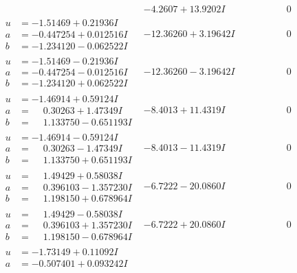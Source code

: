 \documentclass[1p]{elsarticle_modified}
\theoremstyle{definition}
\begin{document}
$$\begin{array}{c|c|c}
 & -4.2607 + 13.9202 I & \phantom{-0.000000 } 0 \\ \hline\begin{aligned}
u &= -1.51469 + 0.21936 I \\
a &= -0.447254 + 0.012516 I \\
b &= -1.234120 - 0.062522 I\end{aligned}
 & -12.36260 + 3.19642 I & \phantom{-0.000000 } 0 \\ \hline\begin{aligned}
u &= -1.51469 - 0.21936 I \\
a &= -0.447254 - 0.012516 I \\
b &= -1.234120 + 0.062522 I\end{aligned}
 & -12.36260 - 3.19642 I & \phantom{-0.000000 } 0 \\ \hline\begin{aligned}
u &= -1.46914 + 0.59124 I \\
a &= \phantom{-}0.30263 + 1.47349 I \\
b &= \phantom{-}1.133750 - 0.651193 I\end{aligned}
 & -8.4013 + 11.4319 I & \phantom{-0.000000 } 0 \\ \hline\begin{aligned}
u &= -1.46914 - 0.59124 I \\
a &= \phantom{-}0.30263 - 1.47349 I \\
b &= \phantom{-}1.133750 + 0.651193 I\end{aligned}
 & -8.4013 - 11.4319 I & \phantom{-0.000000 } 0 \\ \hline\begin{aligned}
u &= \phantom{-}1.49429 + 0.58038 I \\
a &= \phantom{-}0.396103 - 1.357230 I \\
b &= \phantom{-}1.198150 + 0.678964 I\end{aligned}
 & -6.7222 - 20.0860 I & \phantom{-0.000000 } 0 \\ \hline\begin{aligned}
u &= \phantom{-}1.49429 - 0.58038 I \\
a &= \phantom{-}0.396103 + 1.357230 I \\
b &= \phantom{-}1.198150 - 0.678964 I\end{aligned}
 & -6.7222 + 20.0860 I & \phantom{-0.000000 } 0 \\ \hline\begin{aligned}
u &= -1.73149 + 0.11092 I \\
a &= -0.507401 + 0.093242 I \\

\end{aligned}
\end{array}$$
\end{document}
